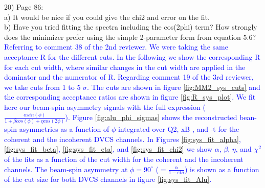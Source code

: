 20) Page 86:\\
  a) It would be nice if you could give the chi2 and error on the fit.\\
  b) Have you tried fitting the spectra including the cos(2phi) term? How 
strongly does the minimizer prefer using the simple 2-parameter form from 
equation 5.6?\\
\textcolor{blue}{ Referring to comment 38 of the 2nd reviewer. We were taking 
the same acceptance R for the different cuts. In the following we show the 
corresponding R for each cut width, where similar changes in the cut width are 
applied in the dominator and the numerator of R. Regarding comment 19 of the 
3rd reviewer, we take cuts from 1 to 5 $\sigma$.  The cuts are shown in figure 
\ref{fig:MM2_sys_cuts} and the corresponding acceptance ratios are shown in 
figure \ref{fig:R_sys_plot}. We fit here our beam-spin asymmetry 
signals with the full expression ($\frac{\alpha sin(\phi)}{1 + \beta cos(\phi) 
+ \eta cos(2\phi)}$). Figure \ref{fig:alu_phi_sigmas} shows the reconstructed 
bean-spin asymmetries as a function of $\phi$ integrated over Q2, xB , and -t 
for the coherent and the incoherent DVCS channels. In Figures 
\ref{fig:sys_fit_alpha}, \ref{fig:sys_fit_beta}, \ref{fig:sys_fit_eta}, and 
\ref{fig:sys_fit_chi2} we show $\alpha$, $\beta$, $\eta$, and $\chi^{2}$ of the 
fits as a function of the cut width for the coherent and the incoherent 
channels. The beam-spin asymmetry at $\phi = 90 ^{\circ}$ ($= 
\frac{\alpha}{1-eta}$) is shown as a function of the cut size for both DVCS 
channels in figure \ref{fig:sys_fit_Alu}. }

